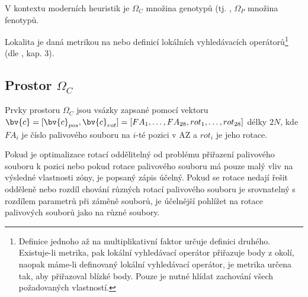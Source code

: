 V kontextu moderních heuristik je $\Omega_C$ množina genotypů (tj. , $\Omega_P$ množina fenotypů.  

Lokalita je daná metrikou na  nebo definicí lokálních vyhledávacích operátorů\footnote{Definice jednoho až na multiplikativní faktor určuje 
definici druhého. Existuje-li metrika, pak lokální vyhledávací operátor přiřazuje body z okolí, naopak máme-li definovaný lokální vyhledávací operátor, 
je metrika určena tak, aby přiřazoval blízké body. Pouze je nutné hlídat zachování všech požadovaných vlastností.} (dle \cite{rothlauf}, kap. 3).



\subsection{Prostor $\Omega_C$}
Prvky prostoru $\Omega_C$ jsou vsázky zapsané pomocí vektoru $\bv{c} = [\bv{c}_{pos}, \bv{c}_{rot}] = [FA_{1},\dots,FA_{28}, rot_{1},\dots,rot_{28}]$ 
délky $2N$, 
kde $FA_{i}$ je číslo palivového souboru na $i$-té pozici v AZ a $rot_{i}$ je jeho rotace.  

Pokud je optimalizace rotací oddělitelný od problému přiřazení palivového souboru k pozici nebo pokud rotace palivového souboru má pouze malý vliv na 
výsledné vlastnosti zóny, je popsaný zápis účelný. Pokud se rotace nedají řešit odděleně nebo rozdíl chování různých rotací palivového souboru je srovnatelný 
s rozdílem parametrů při záměně souborů, je účelnější pohlížet na rotace palivových souborů jako na různé soubory.



